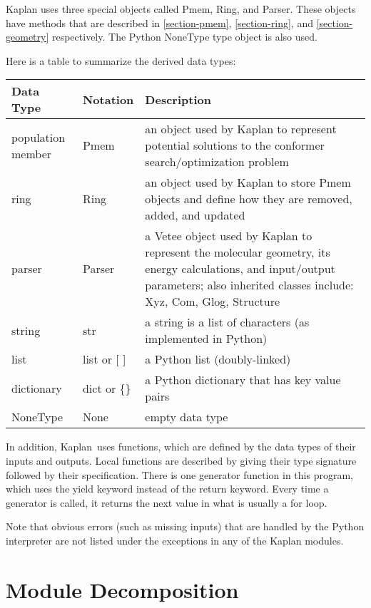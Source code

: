 \documentclass[12pt, titlepage]{article}
\newcommand{\progname}{Kaplan}
\begin{document}
\progname{} uses three special objects called Pmem, Ring, and Parser. These 
objects have methods that are described in \ref{section-pmem}, 
\ref{section-ring}, and \ref{section-geometry} respectively. The Python 
NoneType type object is also used.

Here is a table to summarize the derived data types:

\begin{center}
\renewcommand{\arraystretch}{1.2}
\noindent 
\begin{tabular}{l l p{7.5cm}} 
\toprule 
\textbf{Data Type} & \textbf{Notation} & \textbf{Description}\\ 
\midrule
population member & Pmem & an object used by \progname{} to represent potential 
solutions to the conformer search/optimization problem \\
ring & Ring & an object used by \progname{} to store Pmem objects and define 
how they are removed, added, and updated \\
parser & Parser & a Vetee object used by \progname{} to represent the molecular 
geometry, its energy calculations, and input/output parameters; also inherited 
classes include: Xyz, Com, Glog, Structure \\
string & str & a string is a list of characters (as implemented in Python) \\
list & list or [ ] & a Python list (doubly-linked) \\
dictionary & dict or \{\} & a Python dictionary that has key value pairs \\
NoneType & None & empty data type \\
\bottomrule
\end{tabular} 
\end{center}

In addition, \progname \ uses functions, which
are defined by the data types of their inputs and outputs. Local functions are
described by giving their type signature followed by their specification. There 
is one generator function in this program, which uses the yield keyword instead 
of the return keyword. Every time a generator is called, it returns the next 
value in what is usually a for loop.

Note that obvious errors (such as missing inputs) that are handled by the 
Python interpreter are not listed under the exceptions in any of the 
\progname{} modules.

\section{Module Decomposition}
\end{document}
